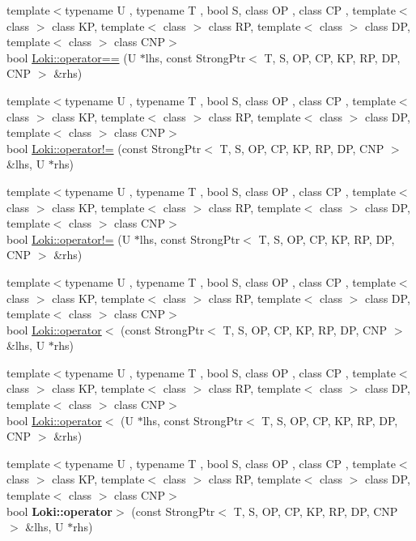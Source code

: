 \begin{DoxyCompactItemize}
\item 
{\footnotesize template$<$typename U , typename T , bool S, class O\+P , class C\+P , template$<$ class $>$ class K\+P, template$<$ class $>$ class R\+P, template$<$ class $>$ class D\+P, template$<$ class $>$ class C\+N\+P$>$ }\\bool \hyperlink{group__SmartPointerGroup_ga48c72731581ab583eec9089f89f7952d}{Loki\+::operator==} (U $\ast$lhs, const Strong\+Ptr$<$ T, S, O\+P, C\+P, K\+P, R\+P, D\+P, C\+N\+P $>$ \&rhs)
\item 
{\footnotesize template$<$typename U , typename T , bool S, class O\+P , class C\+P , template$<$ class $>$ class K\+P, template$<$ class $>$ class R\+P, template$<$ class $>$ class D\+P, template$<$ class $>$ class C\+N\+P$>$ }\\bool \hyperlink{group__SmartPointerGroup_ga96776169708326535577e35ed03b0206}{Loki\+::operator!=} (const Strong\+Ptr$<$ T, S, O\+P, C\+P, K\+P, R\+P, D\+P, C\+N\+P $>$ \&lhs, U $\ast$rhs)
\item 
{\footnotesize template$<$typename U , typename T , bool S, class O\+P , class C\+P , template$<$ class $>$ class K\+P, template$<$ class $>$ class R\+P, template$<$ class $>$ class D\+P, template$<$ class $>$ class C\+N\+P$>$ }\\bool \hyperlink{group__SmartPointerGroup_gaca7b2b5192e9fb2952e93dd3083205a8}{Loki\+::operator!=} (U $\ast$lhs, const Strong\+Ptr$<$ T, S, O\+P, C\+P, K\+P, R\+P, D\+P, C\+N\+P $>$ \&rhs)
\item 
{\footnotesize template$<$typename U , typename T , bool S, class O\+P , class C\+P , template$<$ class $>$ class K\+P, template$<$ class $>$ class R\+P, template$<$ class $>$ class D\+P, template$<$ class $>$ class C\+N\+P$>$ }\\bool \hyperlink{group__SmartPointerGroup_ga20438e5ca3dfc1b9359c2d99cc45d4e0}{Loki\+::operator$<$} (const Strong\+Ptr$<$ T, S, O\+P, C\+P, K\+P, R\+P, D\+P, C\+N\+P $>$ \&lhs, U $\ast$rhs)
\item 
{\footnotesize template$<$typename U , typename T , bool S, class O\+P , class C\+P , template$<$ class $>$ class K\+P, template$<$ class $>$ class R\+P, template$<$ class $>$ class D\+P, template$<$ class $>$ class C\+N\+P$>$ }\\bool \hyperlink{group__SmartPointerGroup_gaf1276b464e5c0354aab98d7c14d82f72}{Loki\+::operator$<$} (U $\ast$lhs, const Strong\+Ptr$<$ T, S, O\+P, C\+P, K\+P, R\+P, D\+P, C\+N\+P $>$ \&rhs)
\item 
\hypertarget{group__SmartPointerGroup_ga2b79faec17ec4ccfaea9149b1008b09d}{}{\footnotesize template$<$typename U , typename T , bool S, class O\+P , class C\+P , template$<$ class $>$ class K\+P, template$<$ class $>$ class R\+P, template$<$ class $>$ class D\+P, template$<$ class $>$ class C\+N\+P$>$ }\\bool {\bfseries Loki\+::operator$>$} (const Strong\+Ptr$<$ T, S, O\+P, C\+P, K\+P, R\+P, D\+P, C\+N\+P $>$ \&lhs, U $\ast$rhs)\label{group__SmartPointerGroup_ga2b79faec17ec4ccfaea9149b1008b09d}


\end{DoxyCompactItemize}
